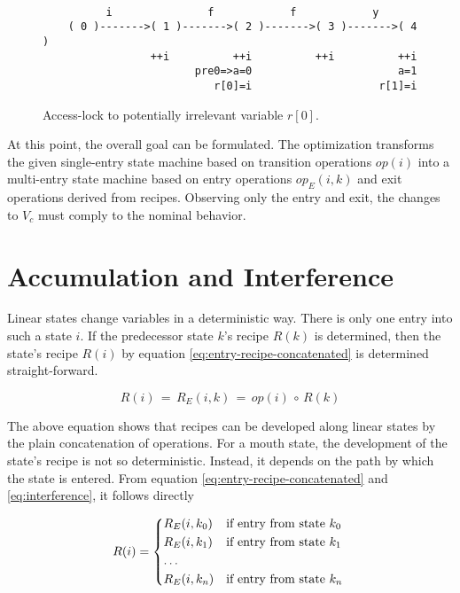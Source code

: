 \documentclass[12pt,a4paper]{scrartcl}
\begin{document}
\begin{figure}[htbp] \leavevmode \label{fig:access-lock}
\begin{verbatim}

          i               f            f            y         
    ( 0 )------->( 1 )------->( 2 )------->( 3 )------->( 4 )
                 ++i          ++i          ++i          ++i 
                        pre0=>a=0                       a=1
                           r[0]=i                    r[1]=i

\end{verbatim}
\caption{Access-lock to potentially irrelevant variable $r[0]$.}
\end{figure}

At this point, the overall goal can be formulated. The optimization transforms
the given single-entry state machine based on transition operations $op(i)$
into a multi-entry state machine based on entry operations $op_E(i,k)$ and exit
operations derived from recipes. Observing only the entry and exit, the changes
to $V_c$ must comply to the nominal behavior. 

%
\section{Accumulation and Interference}

Linear states change variables in a deterministic way. There is only one entry
into such a state $i$. If the predecessor state $k$'s recipe $R(k)$ is
determined, then the state's recipe $R(i)$ by equation \eqref{eq:entry-recipe-concatenated} 
is determined straight-forward.

\begin{equation} \label{eq:linear-state-recipe}
    R(i) \,=\,R_E(i,k) \,=\, op(i)\,\circ\,R(k)
\end{equation}

The above equation shows that recipes can be developed along linear states by
the plain concatenation of operations.  For a mouth state, the development of the
state's recipe is not so deterministic.  Instead, it depends on the path by
which the state is entered.  From equation \eqref{eq:entry-recipe-concatenated}
and \eqref{eq:interference}, it follows directly

\begin{equation} \label{eq:mouth-state-recipe}
    R(i) = \begin{dcases*}
             R_E(i,k_0) & if entry from state $k_0$ \\
             R_E(i,k_1) & if entry from state $k_1$ \\
             \ldots \\
             R_E(i,k_n) & if entry from state $k_n$ \\
            \end{dcases*}
\end{equation}
\end{document}
